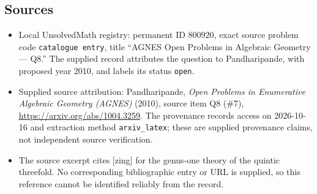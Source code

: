 \documentclass[11pt]{article}
\begin{document}
\subsection{Sources}
\begin{itemize}
\item Local UnsolvedMath registry: permanent ID \(800920\), exact source problem code \texttt{catalogue entry}, title ``AGNES Open Problems in Algebraic Geometry --- Q8.'' The supplied record attributes the question to Pandharipande, with proposed year 2010, and labels its status \texttt{open}.
\item Supplied source attribution: Pandharipande, \emph{Open Problems in Enumerative Algebraic Geometry (AGNES)} (2010), source item Q8 (\#7), \url{https://arxiv.org/abs/1004.3259}. The provenance records access on 2026-10-16 and extraction method \texttt{arxiv\_latex}; these are supplied provenance claims, not independent source verification.
\item The source excerpt cites \textup{[zing]} for the genus-one theory of the quintic threefold. No corresponding bibliographic entry or URL is supplied, so this reference cannot be identified reliably from the record.
\end{itemize}
\end{document}
